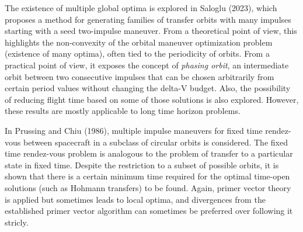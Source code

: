 The existence of multiple global optima is explored in Saloglu (2023), which proposes a method for generating families of transfer orbits with many impulses starting with a seed two-impulse maneuver. From a theoretical point of view, this highlights the non-convexity of the orbital maneuver optimization problem (existence of many optima), often tied to the periodicity of orbits. From a practical point of view, it exposes the concept of \textit{phasing orbit}, an intermediate orbit between two consecutive impulses that can be chosen arbitrarily from certain period values without changing the delta-V budget. Also, the possibility of reducing flight time based on some of those solutions is also explored. However, these results are mostly applicable to long time horizon problems.

In Prussing and Chiu (1986), multiple impulse maneuvers for fixed time rendez-vous between spacecraft in a subclass of circular orbits is considered. The fixed time rendez-vous problem is analogous to the problem of transfer to a particular state in fixed time. Despite the restriction to a subset of possible orbits, it is shown that there is a certain minimum time required for the optimal time-open solutions (such as Hohmann transfers) to be found. Again, primer vector theory is applied but sometimes leads to local optima, and divergences from the established primer vector algorithm can sometimes be preferred over following it stricly.



